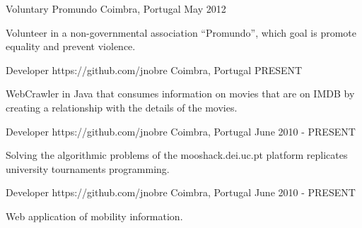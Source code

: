 


\begin{cventries}


\cventry
{Voluntary} %
{Promundo} %
{Coimbra, Portugal} %
{May 2012} %
{ %
\begin{cvitems}
\item {Volunteer in a non-governmental association “Promundo”, which goal is promote equality and prevent violence.}
\end{cvitems}
}


\cventry
{Developer} %
{https://github.com/jnobre} %
{Coimbra, Portugal} %
{PRESENT} %
{ %
\begin{cvitems}
\item {WebCrawler in Java that consumes information on movies that are on IMDB by creating a relationship with the details of the movies.}
\end{cvitems}
}


\cventry
{Developer} %
{https://github.com/jnobre} %
{Coimbra, Portugal} %
{June 2010 - PRESENT} %
{ %
\begin{cvitems}
\item {Solving the algorithmic problems of the mooshack.dei.uc.pt platform replicates university tournaments programming.}
\end{cvitems}
}


\cventry
{Developer} %
{https://github.com/jnobre} %
{Coimbra, Portugal} %
{June 2010 - PRESENT} %
{ %
\begin{cvitems}
\item {Web application of mobility information.}
\end{cvitems}
}


\end{cventries}